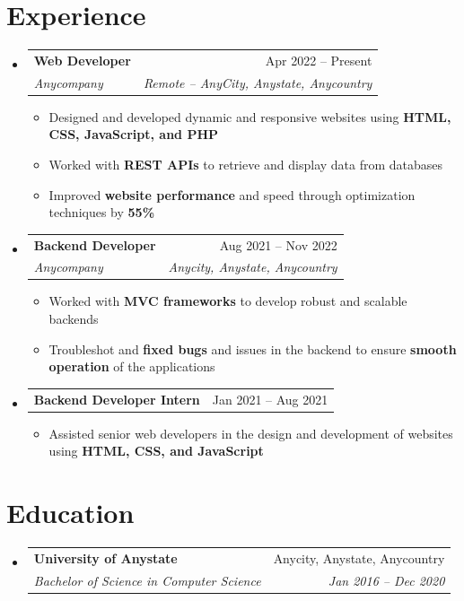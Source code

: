 \documentclass[a4paper,11pt]{article}
\makeatletter
\newcommand{\resumeItem}[1]{
  \item\small{#1}
}
\newcommand{\resumeItemListStart}{\begin{itemize}[rightmargin=0.11in]}
\newcommand{\resumeItemListEnd}{\end{itemize}}
\newcommand{\resumeQuadHeading}[4]{
  \item
  \begin{tabular*}{0.96\textwidth}[t]{l@{\extracolsep{\fill}}r}
    \textbf{#1} & #2 \\
    \textit{\small#3} & \textit{\small #4} \\
  \end{tabular*}
}
\newcommand{\resumeQuadHeadingChild}[2]{
  \item
  \begin{tabular*}{0.96\textwidth}[t]{l@{\extracolsep{\fill}}r}
    \textbf{\small#1} & {\small#2} \\
  \end{tabular*}
}
\newcommand{\resumeHeadingListStart}{
  \begin{itemize}[leftmargin=0.15in, label={}]
}
\newcommand{\resumeHeadingListEnd}{\end{itemize}}
\makeatother
\begin{document}

\section{Experience}
\resumeHeadingListStart{}
  \resumeQuadHeading{Web Developer}{Apr 2022 -- Present}
  {Anycompany}{Remote -- AnyCity, Anystate, Anycountry}
    \resumeItemListStart{}
      \resumeItem{Designed and developed dynamic and responsive websites using \textbf{HTML, CSS, JavaScript, and PHP}}
      \resumeItem{Worked with \textbf{REST APIs} to retrieve and display data from databases}
      \resumeItem{Improved \textbf{website performance} and speed through optimization techniques by \textbf{55\%}}
    \resumeItemListEnd{}

  \resumeQuadHeading{Backend Developer}{Aug 2021 -- Nov 2022}
  {Anycompany}{Anycity, Anystate, Anycountry}
    \resumeItemListStart{}
      \resumeItem{Worked with \textbf{MVC frameworks} to develop robust and scalable backends}
      \resumeItem{Troubleshot and \textbf{fixed bugs} and issues in the backend to ensure \textbf{smooth operation} of the applications}
    \resumeItemListEnd{}

  \resumeQuadHeadingChild{Backend Developer Intern}{Jan 2021 -- Aug 2021}
    \resumeItemListStart{}
      \resumeItem{Assisted senior web developers in the design and development of websites using \textbf{HTML, CSS, and JavaScript}}
    \resumeItemListEnd{}
\resumeHeadingListEnd{}



\section{Education}
  \resumeHeadingListStart{}
    \resumeQuadHeading{University of Anystate}{Anycity, Anystate, Anycountry}
    {Bachelor of Science in Computer Science}{Jan 2016 -- Dec 2020}
  \resumeHeadingListEnd{}


\end{document}
